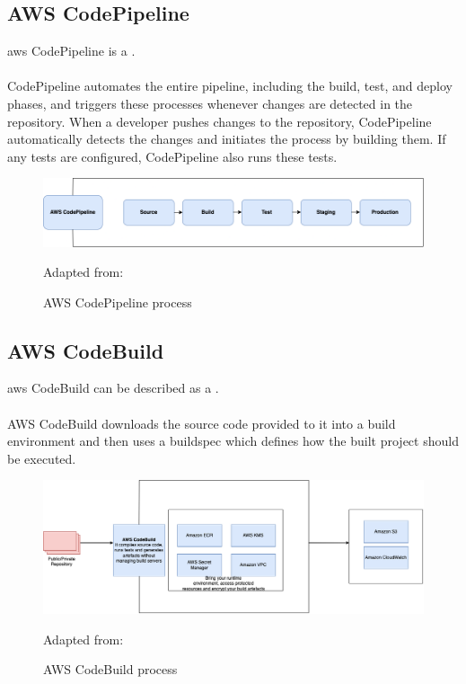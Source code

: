 \subsection{AWS CodePipeline}
\acrshort{aws} CodePipeline is a  \cite{AWSCodePipeline}.
\\~\\
CodePipeline automates the entire \gls{pipeline}, including the build, test, and deploy phases, and triggers these processes whenever changes are detected in the repository. When a developer pushes changes to the repository, CodePipeline automatically detects the changes and initiates the process by building them. If any tests are configured, CodePipeline also runs these tests.\cite{AWSCodePipeline1}
\begin{figure}[H]
    \centering
    \includegraphics[scale=0.4]{Images/CodePipeline.png}
    \caption{AWS CodePipeline process}Adapted from: \cite{AWSCodePipeline2}
    \label{fig: AWS CodePipeline Process}
\end{figure}

\subsection{AWS CodeBuild }
\acrshort{aws} CodeBuild can be described as a  \cite{AWSCodeBuild}.
\\~\\
AWS CodeBuild downloads the source code provided to it into a build environment and then uses a \gls{buildspec} which defines how the built project should be executed. \cite{AWSCodeBuild1}
\begin{figure}[H]
    \centering
    \includegraphics[scale=0.4]{Images/CodeBuild.png}
    \caption{AWS CodeBuild process} Adapted from: \cite{AWSCodeBuild}
    \label{fig: AWS CodeBuild Process}
\end{figure}


